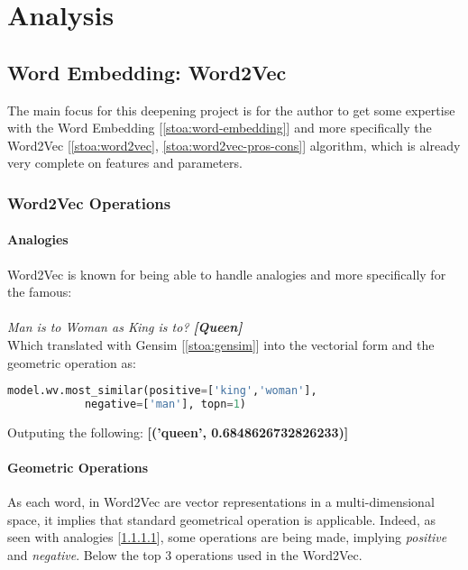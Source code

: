 \chapter{Analysis}
\label{chap:analysis}
\section{Word Embedding: Word2Vec}
The main focus for this deepening project is for the author to get some expertise with the Word Embedding [\ref{stoa:word-embedding}] and more specifically the Word2Vec [\ref{stoa:word2vec}, \ref{stoa:word2vec-pros-cons}] algorithm, which is already very complete on features and parameters\cite{article:word2vec-parameters}.



\subsection{Word2Vec Operations}
\subsubsection{Analogies}
\label{analyse:analogies}

Word2Vec is known for being able to handle analogies and more specifically for the famous:\\\\ \textit{Man is to Woman as King is to? \textbf{[Queen]}}\\ 

Which translated with Gensim [\ref{stoa:gensim}] into the vectorial form and the geometric operation as:
\begin{lstlisting}[language=Python]
model.wv.most_similar(positive=['king','woman'],
            negative=['man'], topn=1)
\end{lstlisting}

Outputing the following: \textbf{[('queen', 0.6848626732826233)]}

\subsubsection{Geometric Operations}
As each word, in Word2Vec are vector representations in a multi-dimensional space, it implies that standard geometrical operation is applicable. Indeed, as seen with analogies [\ref{analyse:analogies}], some operations are being made, implying \textit{positive} and \textit{negative}. Below the top 3 operations used in the Word2Vec.

